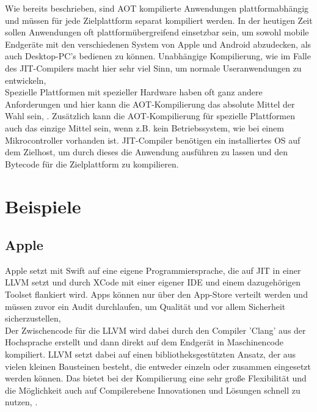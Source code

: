 Wie bereits beschrieben, sind \ac{AOT} kompilierte Anwendungen plattformabhängig und müssen für jede Zielplattform separat kompiliert werden. In der heutigen Zeit sollen Anwendungen oft plattformübergreifend einsetzbar sein, um sowohl mobile Endgeräte mit den verschiedenen System von Apple und Android abzudecken, als auch Desktop-PC's bedienen zu können. Unabhängige Kompilierung, wie im Falle des \ac{JIT}-Compilers macht hier sehr viel Sinn, um normale Useranwendungen zu entwickeln, \cite[vgl. Kotzmann Wimmer, 2008, S.18ff]{KotzmannWimmer2008} \\
Spezielle Plattformen mit spezieller Hardware haben oft ganz andere Anforderungen und hier kann die \ac{AOT}-Kompilierung das absolute Mittel der Wahl sein, \cite[vgl. Louis 2016, S.1]{louis_2016}. Zusätzlich kann die \ac{AOT}-Kompilierung für spezielle Plattformen auch das einzige Mittel sein, wenn z.B. kein Betriebssystem, wie bei einem Mikrocontroller vorhanden ist. \ac{JIT}-Compiler benötigen ein installiertes \ac{OS} auf dem Zielhost, um durch dieses die Anwendung ausführen zu lassen und den Bytecode für die Zielplattform zu kompilieren. 

\section{Beispiele}
\subsection{Apple}
Apple setzt mit Swift auf eine eigene Programmiersprache, die auf \ac{JIT} in einer \ac{LLVM} setzt und durch XCode mit einer eigener \ac{IDE} und einem dazugehörigen Toolset flankiert wird. Apps können nur über den App-Store verteilt werden und müssen zuvor ein Audit durchlaufen, um Qualität und vor allem Sicherheit sicherzustellen, \cite[vgl. Apple Inc. 2022, Webseite abgerufen am 03.12.2022]{swift_compiler} \\
Der Zwischencode für die \ac{LLVM} wird dabei durch den Compiler 'Clang' aus der Hochsprache erstellt und dann direkt auf dem Endgerät in Maschinencode kompiliert. \ac{LLVM} setzt dabei auf einen bibliotheksgestützten Ansatz, der aus vielen kleinen Bausteinen besteht, die entweder einzeln oder zusammen eingesetzt werden können. Das bietet bei der Kompilierung eine sehr große Flexibilität und die Möglichkeit auch auf Compilerebene Innovationen und Lösungen schnell zu nutzen, \cite[vgl. Apple Inc. 2012, Webseite abgerufen am 03.12.2022]{llvm_overview_2012}. 

